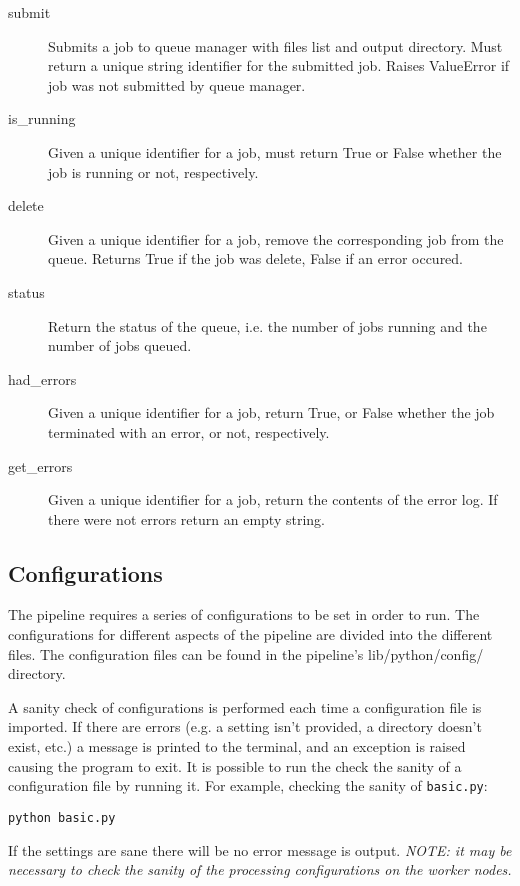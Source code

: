 \begin{description}
    \item[submit] Submits a job to queue manager with files list and output directory. Must return a unique string identifier for the submitted job. Raises ValueError if job was not submitted by queue manager.

    \item[is\_running] Given a unique identifier for a job, must return True or False whether the job is running or not, respectively.

    \item[delete] Given a unique identifier for a job, remove the corresponding job from the queue. Returns True if the job was delete, False if an error occured.

    \item[status] Return the status of the queue, i.e. the number of jobs running and the number of jobs queued.

    \item[had\_errors] Given a unique identifier for a job, return True, or False whether the job terminated with an error, or not, respectively.

    \item[get\_errors] Given a unique identifier for a job, return the contents of the error log. If there were not errors return an empty string.
\end{description}


\subsection{Configurations}
\label{sec:configs}

The pipeline requires a series of configurations to be set in order to run. The configurations for different aspects of the pipeline are divided into the different files. The configuration files can be found in the pipeline's lib/python/config/ directory.

A sanity check of configurations is performed each time a configuration file is imported. If there are errors (e.g. a setting isn't provided, a directory doesn't exist, etc.) a message is printed to the terminal, and an exception is raised causing the program to exit. It is possible to run the check the sanity of a configuration file by running it. For example, checking the sanity of \texttt{basic.py}:

\texttt{python basic.py}

If the settings are sane there will be no error message is output. \textit{NOTE: it may be necessary to check the sanity of the processing configurations on the worker nodes.}

